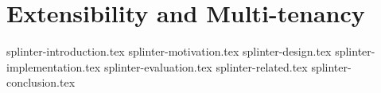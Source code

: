 \chapter{Extensibility and Multi-tenancy}

 {splinter-introduction.tex}
 {splinter-motivation.tex}
 {splinter-design.tex}
 {splinter-implementation.tex}
 {splinter-evaluation.tex}
 {splinter-related.tex}
 {splinter-conclusion.tex}
